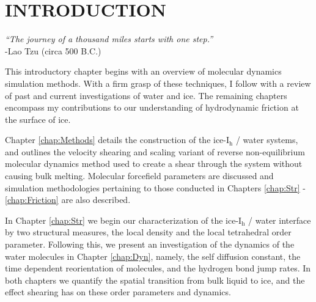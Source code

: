 \chapter{INTRODUCTION}\label{chap:intro}
%
%
%
%
%
%



\begin{flushright}
\textit{``The journey of a thousand miles starts with one step.''} \\
-Lao Tzu (circa 500 B.C.) \\
\end{flushright}

This introductory chapter begins with an overview of molecular
dynamics simulation methods. With a firm grasp of these techniques, I
follow with a review of past and current investigations of water and
ice. The remaining chapters encompass my contributions to
our understanding of hydrodynamic friction at the surface of ice.

Chapter \ref{chap:Methods} details the construction of the
ice-I$_\mathrm{h}$ / water systems, and outlines the velocity shearing
and scaling variant of reverse non-equilibrium molecular dynamics
method used to create a shear through the system without causing bulk
melting. Molecular forcefield parameters are discussed and simulation
methodologies pertaining to those conducted in Chapters
\ref{chap:Str} - \ref{chap:Friction} are also described.

In Chapter \ref{chap:Str} we begin our characterization of the
ice-I$_\mathrm{h}$ / water interface by two structural measures, the
local density and the local tetrahedral order parameter. Following
this, we present an investigation of the dynamics of the water
molecules in Chapter \ref{chap:Dyn}, namely, the self diffusion
constant, the time dependent reorientation of molecules, and the
hydrogen bond jump rates. In both chapters we quantify the spatial
transition from bulk liquid to ice, and the effect shearing has
on these order parameters and dynamics.

